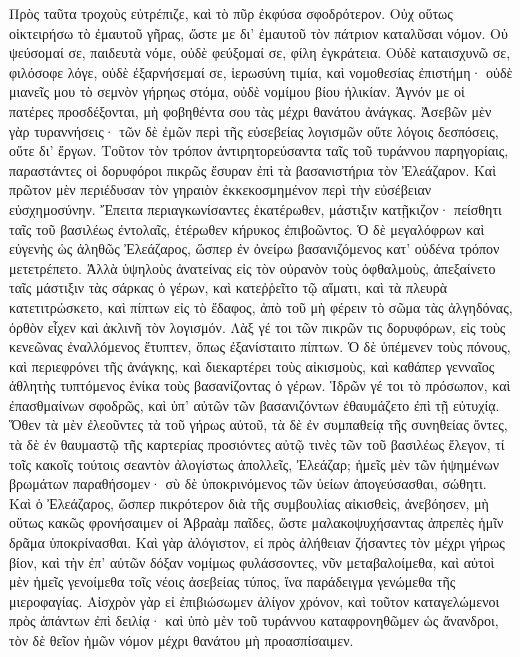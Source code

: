 Πρὸς ταῦτα τροχοὺς εὐτρέπιζε, καὶ τὸ πῦρ ἐκφύσα σφοδρότερον. 
Οὐχ οὕτως οἰκτειρήσω τὸ ἐμαυτοῦ γῆρας, ὥστε με δι' ἐμαυτοῦ τὸν πάτριον καταλῦσαι νόμον. 
Οὐ ψεύσομαί σε, παιδευτὰ νόμε, οὐδὲ φεύξομαί σε, φίλη ἐγκράτεια. 
Οὐδὲ καταισχυνῶ σε, φιλόσοφε λόγε, οὐδὲ ἐξαρνήσεμαί σε, ἱερωσύνη τιμία, καὶ νομοθεσίας ἐπιστήμη· 
οὐδὲ μιανεῖς μου τὸ σεμνὸν γήρηως στόμα, οὐδὲ νομίμου βίου ἡλικίαν. 
Ἁγνόν με οἱ πατέρες προσδέξονται, μὴ φοβηθέντα σου τὰς μέχρι θανάτου ἀνάγκας. 
Ἀσεβῶν μὲν γὰρ τυραννήσεις· τῶν δὲ ἐμῶν περὶ τῆς εὐσεβείας λογισμῶν οὔτε λόγοις δεσπόσεις, οὔτε δι' ἔργων. 
Τοῦτον τὸν τρόπον ἀντιρητορεύσαντα ταῖς τοῦ τυράννου παρηγορίαις, παραστάντες οἱ δορυφόροι πικρῶς ἔσυραν ἐπὶ τὰ βασανιστήρια τὸν Ἐλεάζαρον. 
Καὶ πρῶτον μὲν περιέδυσαν τὸν γηραιὸν ἐκκεκοσμημένον περὶ τὴν εὐσέβειαν εὐσχημοσύνην. 
Ἔπειτα περιαγκωνίσαντες ἑκατέρωθεν, μάστιξιν κατῇκιζον· 
πείσθητι ταῖς τοῦ βασιλέως ἐντολαῖς, ἑτέρωθεν κήρυκος ἐπιβοῶντος. 
Ὁ δὲ μεγαλόφρων καὶ εὐγενὴς ὡς ἀληθῶς Ἐλεάζαρος, ὥσπερ ἐν ὀνείρω βασανιζόμενος κατ' οὐδένα τρόπον μετετρέπετο. 
Ἀλλὰ ὑψηλοὺς ἀνατείνας εἰς τὸν οὐρανὸν τοὺς ὀφθαλμοὺς, ἀπεξαίνετο ταῖς μάστιξιν τὰς σάρκας ὁ γέρων, καὶ κατεῤῥεῖτο τῷ αἵματι, 
καὶ τὰ πλευρὰ κατετιτρώσκετο, καὶ πίπτων εἰς τὸ ἔδαφος, ἀπὸ τοῦ μὴ φέρειν τὸ σῶμα τὰς ἀλγηδόνας, ὀρθὸν εἶχεν καὶ ἀκλινῆ τὸν λογισμόν. 
Λὰξ γέ τοι τῶν πικρῶν τις δορυφόρων, εἰς τοὺς κενεῶνας ἐναλλόμενος ἔτυπτεν, ὅπως ἐξανίσταιτο πίπτων. 
Ὁ δὲ ὑπέμενεν τοὺς πόνους, καὶ περιεφρόνει τῆς ἀνάγκης, καὶ διεκαρτέρει τοὺς αἰκισμοὺς, 
καὶ καθάπερ γενναῖος ἀθλητὴς τυπτόμενος ἐνίκα τοὺς βασανίζοντας ὁ γέρων. 
Ἱδρῶν γέ τοι τὸ πρόσωπον, καὶ ἐπασθμαίνων σφοδρῶς, καὶ ὑπ' αὐτῶν τῶν βασανιζόντων ἐθαυμάζετο ἐπὶ τῇ εὐτυχίᾳ. 
Ὅθεν τὰ μὲν ἐλεοῦντες τὰ τοῦ γήρως αὐτοῦ, τὰ δὲ ἐν συμπαθείᾳ τῆς συνηθείας ὄντες, 
τὰ δὲ ἐν θαυμαστῷ τῆς καρτερίας προσιόντες αὐτῷ τινὲς τῶν τοῦ βασιλέως ἔλεγον, 
τί τοῖς κακοῖς τούτοις σεαντὸν ἀλογίστως ἀπολλεῖς, 
Ἐλεάζαρ; ἡμεῖς μὲν τῶν ἡψημένων βρωμάτων παραθήσομεν· σὺ δὲ ὑποκρινόμενος τῶν ὑείων ἀπογεύσασθαι, σώθητι. 
Καὶ ὁ Ἐλεάζαρος, ὥσπερ πικρότερον διὰ τῆς συμβουλίας αἰκισθεὶς, ἀνεβόησεν, 
μὴ οὕτως κακῶς φρονήσαιμεν οἱ Ἁβραὰμ παῖδες, ὥστε μαλακοψυχήσαντας ἀπρεπὲς ἡμῖν δρᾶμα ὑποκρίνασθαι. 
Καὶ γὰρ ἀλόγιστον, εἰ πρὸς ἀλήθειαν ζήσαντες τὸν μέχρι γήρως βίον, καὶ τὴν ἐπ' αὐτῶν δόξαν νομίμως φυλάσσοντες, νῦν μεταβαλοίμεθα, 
καὶ αὐτοὶ μὲν ἡμεῖς γενοίμεθα τοῖς νέοις ἀσεβείας τύπος, ἵνα παράδειγμα γενώμεθα τῆς μιεροφαγίας. 
Αἰσχρὸν γὰρ εἰ ἐπιβιώσωμεν ἀλίγον χρόνον, 
καὶ τοῦτον καταγελώμενοι πρὸς ἁπάντων ἐπὶ δειλίᾳ· καὶ ὑπὸ μὲν τοῦ τυράννου καταφρονηθῶμεν ὡς ἄνανδροι, τὸν δὲ θεῖον ἡμῶν νόμον μέχρι θανάτου μὴ προασπίσαιμεν. 
